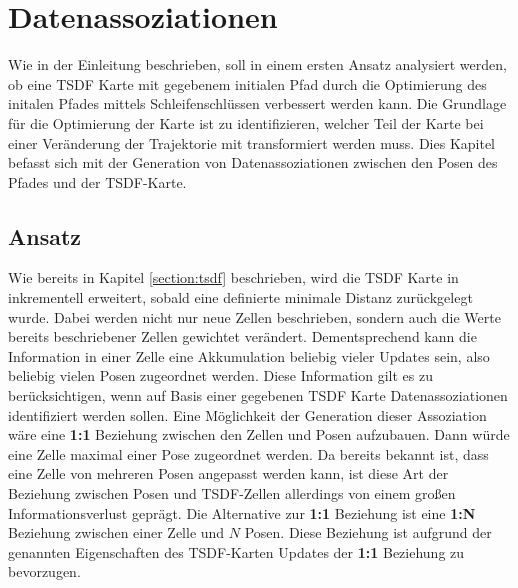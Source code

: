 \chapter{Datenassoziationen}\label{chapter:association}

Wie in der Einleitung beschrieben, soll in einem ersten Ansatz analysiert werden, ob eine TSDF Karte mit gegebenem initialen Pfad durch die Optimierung des initalen Pfades mittels Schleifenschlüssen verbessert werden kann. Die Grundlage für die Optimierung der Karte ist zu identifizieren, welcher Teil der Karte bei einer Veränderung der Trajektorie mit transformiert werden muss. Dies Kapitel befasst sich mit der Generation von Datenassoziationen zwischen den Posen des Pfades und der TSDF-Karte.

\section{Ansatz}
\label{section:ansatz}

Wie bereits in Kapitel \ref{section:tsdf} beschrieben, wird die TSDF Karte in \cite{HATSDF} inkrementell erweitert, sobald eine definierte minimale Distanz zurückgelegt wurde. Dabei werden nicht nur neue Zellen beschrieben, sondern auch die Werte bereits beschriebener Zellen gewichtet verändert. Dementsprechend kann die Information in einer Zelle eine Akkumulation beliebig vieler Updates sein, also beliebig vielen Posen zugeordnet werden. Diese Information gilt es zu berücksichtigen, wenn auf Basis einer gegebenen TSDF Karte Datenassoziationen identifiziert werden sollen.
Eine Möglichkeit der Generation dieser Assoziation wäre eine \textbf{1:1} Beziehung zwischen den Zellen und Posen aufzubauen. Dann würde eine Zelle maximal einer Pose zugeordnet werden. Da bereits bekannt ist, dass eine Zelle von mehreren Posen angepasst werden kann, ist diese Art der Beziehung zwischen Posen und TSDF-Zellen allerdings von einem großen Informationsverlust geprägt. Die Alternative zur \textbf{1:1} Beziehung ist eine \textbf{1:N} Beziehung zwischen einer Zelle und $N$ Posen. Diese Beziehung ist aufgrund der genannten Eigenschaften des TSDF-Karten Updates der \textbf{1:1} Beziehung zu bevorzugen.

